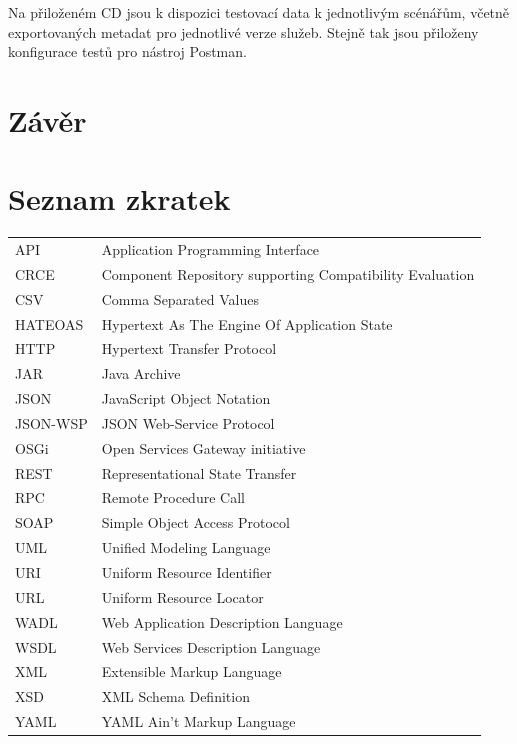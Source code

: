 \documentclass[czech,DP]{thesiskiv}
\newcommand\nomenclature[2]{#1 & #2 \\}
\begin{document}
Na přiloženém CD jsou k dispozici testovací data k jednotlivým scénářům, včetně exportovaných metadat pro jednotlivé verze služeb. Stejně tak jsou přiloženy konfigurace testů pro nástroj Postman.


\chapter{Závěr}	

 
% 
%

{\raggedright\small

}

\chapter*{Seznam zkratek}

\begin{longtable}{@{}p{3cm}@{}p{\dimexpr\textwidth-1cm\relax}@{}}
	\nomenclature{API}{Application Programming Interface}
	\nomenclature{CRCE}{Component Repository supporting Compatibility Evaluation}
	\nomenclature{CSV}{Comma Separated Values}
	\nomenclature{HATEOAS}{Hypertext As The Engine Of Application State}
	\nomenclature{HTTP}{Hypertext Transfer Protocol}
	\nomenclature{JAR}{Java Archive}
	\nomenclature{JSON}{JavaScript Object Notation}
	\nomenclature{JSON-WSP}{JSON Web-Service Protocol}
	\nomenclature{OSGi}{Open Services Gateway initiative}
	\nomenclature{REST}{Representational State Transfer}
	\nomenclature{RPC}{Remote Procedure Call}
	\nomenclature{SOAP}{Simple Object Access Protocol}
	\nomenclature{UML}{Unified Modeling Language}
	\nomenclature{URI}{Uniform Resource Identifier}
	\nomenclature{URL}{Uniform Resource Locator}
	\nomenclature{WADL}{Web Application Description Language}
	\nomenclature{WSDL}{Web Services Description Language}
	\nomenclature{XML}{Extensible Markup Language}
	\nomenclature{XSD}{XML Schema Definition}
	\nomenclature{YAML}{YAML Ain't Markup Language}
\end{longtable}

\appendix
\end{document}
